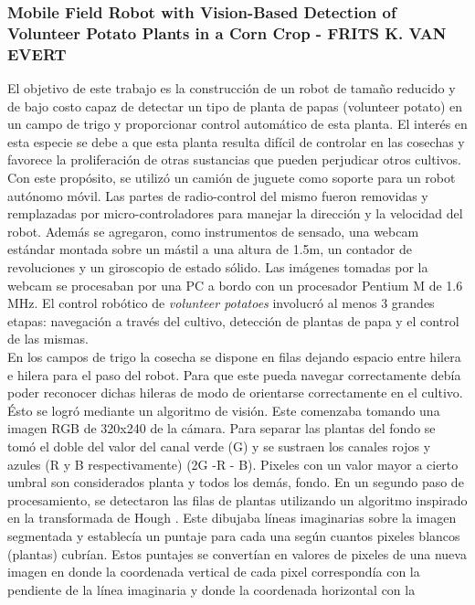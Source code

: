 	\subsubsection{\label{volunteer}Mobile Field Robot with Vision-Based Detection of Volunteer Potato Plants in a Corn Crop - FRITS K. VAN EVERT}
	El objetivo de este trabajo es la construcción de un robot de 
	tamaño reducido y de bajo costo capaz de detectar un tipo de 
	planta de papas (volunteer potato) en un campo de trigo y proporcionar control automático de esta planta. El interés en 
	esta especie se debe a que esta planta resulta difícil de controlar en las cosechas y favorece la 
	proliferación de otras sustancias que pueden perjudicar otros 
	cultivos. Con este propósito, se utilizó un camión de juguete como 
	soporte para un robot autónomo móvil. Las partes de 
	radio-control del mismo fueron 
	removidas y remplazadas por micro-controladores para manejar la 
	dirección y la velocidad del robot. Además se agregaron, como instrumentos de 
	sensado, una webcam estándar montada sobre un mástil a 
	una altura de 1.5m, un contador de revoluciones y un giroscopio de 
	estado sólido. Las imágenes tomadas por la webcam se procesaban 
	por una PC a bordo con un procesador Pentium M de 1.6 MHz. El control robótico de \emph{volunteer potatoes} 
	involucró al menos 3 grandes etapas: navegación a través del cultivo, detección 
	de plantas de papa y el control de las mismas.\\
	\indent En los campos de trigo la cosecha se dispone en filas 
	dejando espacio entre hilera e hilera para el paso del robot. Para 
	que este pueda navegar correctamente debía poder reconocer dichas 
	hileras de modo de orientarse correctamente en el cultivo. Ésto se 
	logró mediante un algoritmo de visión. Este comenzaba 
	tomando una imagen RGB de 320x240 de la cámara. Para separar las 
	plantas del fondo se tomó el doble del valor del canal verde (G)  y se 
	sustraen los canales rojos y azules (R y B respectivamente) (2G -R - B). Pixeles con un 
	valor mayor a cierto umbral son considerados planta y todos los 
	demás, fondo. En un segundo paso de procesamiento, se detectaron las 
	filas de plantas utilizando un algoritmo inspirado en la 
	transformada de Hough \cite{hough62}. Este dibujaba líneas imaginarias sobre la 
	imagen segmentada y establecía un puntaje para cada una según 
	cuantos pixeles blancos (plantas) cubrían. Estos puntajes se 
	convertían en valores de pixeles de una nueva imagen en donde la 
	coordenada vertical de cada pixel correspondía con la pendiente de 
	la línea imaginaria y donde la coordenada horizontal con la 
